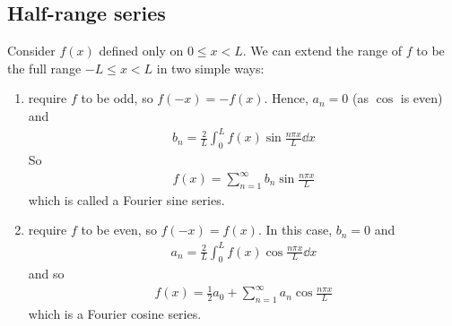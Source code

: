 \subsection{Half-range series}
Consider $f(x)$ defined only on $0 \leq x < L$.
We can extend the range of $f$ to be the full range $-L \leq x < L$ in two simple ways:
\begin{enumerate}
    \item require $f$ to be odd, so $f(-x) = -f(x)$.
        Hence, $a_n = 0$ (as $\cos$ is even) and
        \begin{align} \label{eq:1.11}
            b_n = \frac{2}{L} \int_0^L f(x) \sin \frac{n \pi x}{L} \dd{x}
        \end{align}
        So
        \begin{align*}
            f(x) = \sum_{n=1}^\infty b_n \sin \frac{n\pi x}{L}
        \end{align*}
        which is called a Fourier sine series.
    \item require $f$ to be even, so $f(-x) = f(x)$.
        In this case, $b_n = 0$ and
        \begin{align} \label{eq:1.12}
            a_n = \frac{2}{L} \int_0^L f(x) \cos \frac{n \pi x}{L} \dd{x}
        \end{align}
        and so
        \begin{align*}
            f(x) = \frac{1}{2}a_0 + \sum_{n=1}^\infty a_n \cos \frac{n\pi x}{L}
        \end{align*}
        which is a Fourier cosine series.
\end{enumerate}

